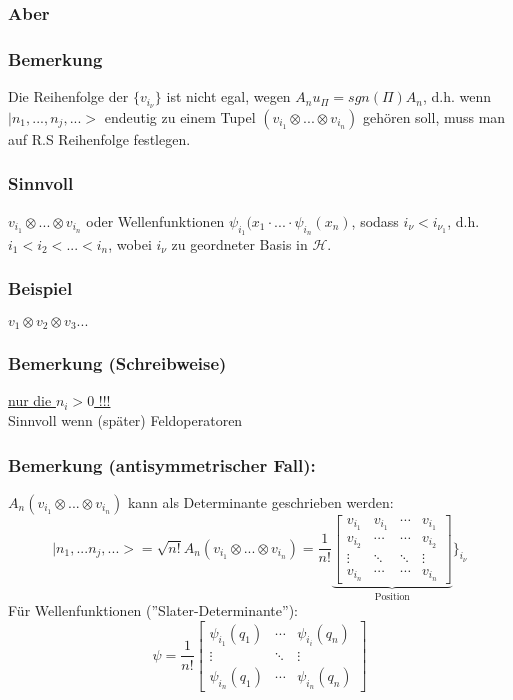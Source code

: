 \documentclass[twoside,a4paper]{scrartcl}
\renewcommand{\1}{\mathds{1}}
\renewcommand{\H}{\mathcal{H}}
\begin{document}
\subsubsection*{Aber}
\subsubsection*{Bemerkung}
Die Reihenfolge der $\{v_{i_\nu}\}$ ist nicht egal, wegen $A_n u_\Pi=sgn(\Pi) A_n$, d.h. wenn $|n_1,...,n_j,...>$ endeutig zu einem Tupel $(v_{i_1}\otimes ... \otimes v_{i_n})$ gehören soll, muss man auf R.S Reihenfolge festlegen.
\subsubsection*{Sinnvoll}
$v_{i_1}\otimes ... \otimes v_{i_n}$ oder Wellenfunktionen $\psi_{i_1}(x_1\cdot ... \cdot \psi_{i_n}(x_n)$, sodass $i_\nu< i_{\nu_1}$, d.h. $i_1<i_2<...<i_n$, wobei $i_\nu$ zu geordneter Basis in $\H$.
\subsubsection*{Beispiel}
$v_1\otimes v_2 \otimes v_3 ...$
\subsubsection*{Bemerkung (Schreibweise)}
\underline{nur die $n_i>0$ !!!}\\
Sinnvoll wenn (später) Feldoperatoren
\subsubsection*{Bemerkung (antisymmetrischer Fall):}
$A_n(v_{i_1}\otimes ... \otimes v_{i_n})$ kann als Determinante geschrieben werden:
$$|n_1,...n_j,...>=\sqrt{n!} A_n(v_{i_1}\otimes ... \otimes v_{i_n})=\frac{1}{n!} \underbrace{\begin{bmatrix} v_{i_1} & v_{i_1} & \cdots &v_{i_1}\\ v_{i_2} & \cdots & \cdots &v_{i_2} \\ \vdots & \ddots & \ddots & \vdots \\ v_{i_n} & \cdots & \cdots &v_{i_n} \end{bmatrix}}_{\mathrm{Position}}\rbrace_{i_\nu}$$
Für Wellenfunktionen (''Slater-Determinante''):
$$\psi=\frac{1}{n!} \begin{bmatrix} \psi_{i_1}(q_1) & \cdots &\psi_{i_i}(q_n)\\ \vdots & \ddots & \vdots \\ \psi_{i_n}(q_1) & \cdots & \psi_{i_n}(q_n) \end{bmatrix}$$
\end{document}

